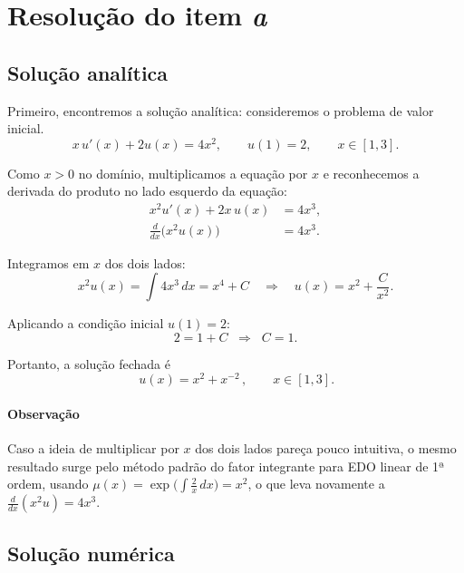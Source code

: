 \documentclass[11pt,a4paper]{article}
\begin{document}
\section{Resolução do item \textit{a}}


\subsection{Solução analítica}

Primeiro, encontremos a solução analítica: consideremos o problema de valor inicial.
\[
x\,u'(x)+2u(x)=4x^{2}, \qquad u(1)=2, \qquad x\in[1,3].
\]

Como $x>0$ no domínio, multiplicamos a equação por $x$ e reconhecemos a derivada do produto no lado esquerdo da equação:
\begin{align*}
x^2 u'(x)+2x\,u(x) &= 4x^3,\\
\frac{d}{dx}\big(x^{2}u(x)\big) &= 4x^{3}.
\end{align*}

Integramos em $x$ dos dois lados:
\[
x^{2}u(x)=\int 4x^{3}\,dx = x^{4}+C
\quad\Longrightarrow\quad
u(x)=x^{2}+\frac{C}{x^{2}}.
\]

Aplicando a condição inicial $u(1)=2$:
\[
2 = 1 + C \;\;\Longrightarrow\;\; C=1.
\]

Portanto, a solução fechada é
\[
\boxed{\,u(x)=x^{2}+x^{-2}\,},\qquad x\in[1,3].
\]

\paragraph{Observação} Caso a ideia de multiplicar por $x$ dos dois lados pareça pouco intuitiva, o mesmo resultado surge pelo método padrão do fator integrante para EDO linear de 1ª ordem, usando $\mu(x)=\exp\!\big(\int \tfrac{2}{x}\,dx\big)=x^2$, o que leva novamente a $\frac{d}{dx}(x^2 u)=4x^3$.

\subsection{Solução numérica}
\end{document}
